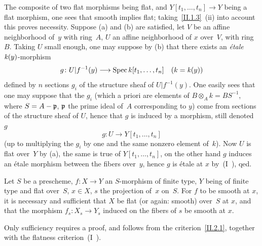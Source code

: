 The composite of two flat morphisms being flat, and
$Y[t_{1},\dots,t_{n}]\to Y$ being a flat morphism, one sees that
smooth implies flat; taking~\ref{II.1.3}~(ii) into account this proves
necessity. Suppose (a) and (b) are satisfied, let $V$ be
an affine neighborhood of~$y$ with ring~$A$, $U$ an affine neighborhood of
$x$ over~$V$, with ring $B$. Taking $U$ small enough, one may
suppose by (b) that there exists an \emph{\'etale} $\mathit{k}(y)$-morphism
\[
g\colon U|f^{-1}(y)\to\Spec k[t_{1},\dots,t_{n}]\quad (k=\kres(y))
\]
defined by $n$ sections $g_{i}$ of the structure sheaf of
$U|f^{-1}(y)$. One easily sees that one may suppose that the
$g_{i}$ (which a priori are elements of
$B\otimes_{A}k=BS^{-1}$, where $S=A-\mathfrak{p}$, $\mathfrak{p}$ the prime
ideal of~$A$ corresponding to $y$) come from sections of
the structure sheaf of
$U$,
hence that $g$ is induced by a morphism,
still denoted~$g$
\[
g\colon U\to Y[t_{1},\dots,t_{n}]
\]
(up to multiplying the $g_{i}$ by one and the same
nonzero element of~$k$). Now
$U$
is flat over~$Y$ by (a), the same is true of
$Y[t_{1},\dots,t_{n}]$, on the other hand $g$ induces an
\'etale morphism between the fibers over~$y$, hence $g$ is \'etale at
$x$ by~(I~), qed.

\begin{corollary}
\label{II.2.2}
Let $S$ be a prescheme, $f\colon X\to Y$ an $S$-morphism of
finite type, $Y$ being of finite type and flat over~$S$, $x\in X$, $s$
the projection of~$x$ on~$S$. For $f$ to be smooth at $x$, it is necessary
and sufficient that $X$ be flat (or again: smooth) over~$S$ at $x$, and
that the morphism $f_{s}\colon X_{s}\to Y_{s}$ induced on the fibers of
$s$ be smooth at $x$.
\end{corollary}

Only sufficiency requires a proof, and follows from
the criterion~\ref{II.2.1}, together with the
flatness criterion~(I~).

